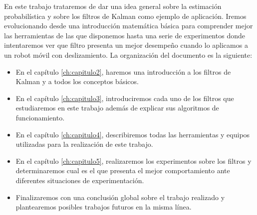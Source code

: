 En este trabajo trataremos de dar una idea general sobre la estimación probabilística y sobre los filtros de Kalman como ejemplo de aplicación. Iremos evolucionando desde una introducción matemática básica para comprender mejor las herramientas de las que disponemos hasta una serie de experimentos donde intentaremos ver que filtro presenta un mejor desempeño cuando lo aplicamos a un robot móvil con deslizamiento. La organización del documento es la siguiente:
\begin{itemize}
\item En el capítulo \ref{ch:capitulo2}, haremos una introducción a los filtros de Kalman y a todos los conceptos básicos.
\item En el capítulo \ref{ch:capitulo3}, introduciremos cada uno de los filtros que estudiaremos en este trabajo además de explicar sus algoritmos de funcionamiento.
\item En el capítulo \ref{ch:capitulo4}, describiremos todas las herramientas y equipos utilizadas para la realización de este trabajo.
\item En el capítulo \ref{ch:capitulo5}, realizaremos los experimentos sobre los filtros y determinaremos cual es el que presenta el mejor comportamiento ante diferentes situaciones de experimentación.
\item Finalizaremos con una conclusión global sobre el trabajo realizado y plantearemos posibles trabajos futuros en la misma línea.

\end{itemize}

%
%
%
